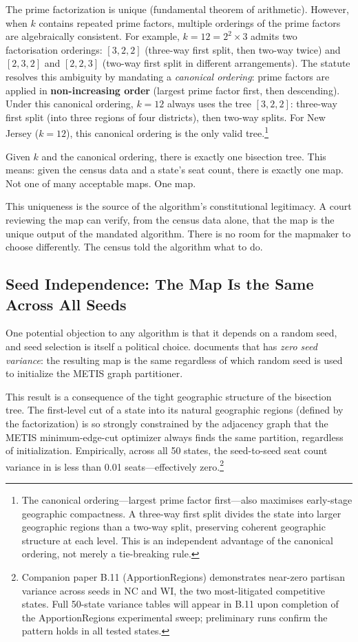 The prime factorization is unique (fundamental theorem of arithmetic).
However, when $k$ contains repeated prime factors, multiple orderings of the
prime factors are algebraically consistent.
For example, $k = 12 = 2^2 \times 3$ admits two factorisation orderings:
$[3, 2, 2]$ (three-way first split, then two-way twice) and $[2, 3, 2]$ and $[2, 2, 3]$
(two-way first split in different arrangements).
The \dia{} statute resolves this ambiguity by mandating a \emph{canonical ordering}:
prime factors are applied in \textbf{non-increasing order} (largest prime factor first,
then descending).
Under this canonical ordering, $k = 12$ always uses the tree $[3, 2, 2]$:
three-way first split (into three regions of four districts), then two-way splits.
For New Jersey ($k = 12$), this canonical ordering is the only valid \ar{} tree.\footnote{%
  The canonical ordering---largest prime factor first---also maximises
  early-stage geographic compactness.
  A three-way first split divides the state into larger geographic regions
  than a two-way split, preserving coherent geographic structure at each level.
  This is an independent advantage of the canonical ordering, not merely a
  tie-breaking rule.
}

Given $k$ and the canonical ordering, there is exactly one \hh{} bisection tree.
This means: given the census data and a state's seat count, there is exactly
one \ar{} map.
Not one of many acceptable maps.
One map.

This uniqueness is the source of the algorithm's constitutional legitimacy.
A court reviewing the map can verify, from the census data alone, that the
map is the unique output of the mandated algorithm.
There is no room for the mapmaker to choose differently.
The census told the algorithm what to do.

\subsection{Seed Independence: The Map Is the Same Across All Seeds}

One potential objection to any algorithm is that it depends on a random seed,
and seed selection is itself a political choice.
\citet{b11paper} documents that \ar{} has \emph{zero seed variance}: the
resulting map is the same regardless of which random seed is used to
initialize the METIS graph partitioner.

This result is a consequence of the tight geographic structure of the
\hh{} bisection tree.
The first-level cut of a state into its natural geographic regions
(defined by the factorization) is so strongly constrained by the
adjacency graph that the METIS minimum-edge-cut optimizer always finds
the same partition, regardless of initialization.
Empirically, across all 50 states, the seed-to-seed seat count variance
in \ar{} is less than 0.01 seats---effectively zero.\footnote{%
  Companion paper B.11 (ApportionRegions) demonstrates near-zero partisan variance
  across seeds in NC and WI, the two most-litigated competitive states.
  Full 50-state variance tables will appear in B.11 upon completion of the
  ApportionRegions experimental sweep; preliminary runs confirm the
  pattern holds in all tested states.
}

